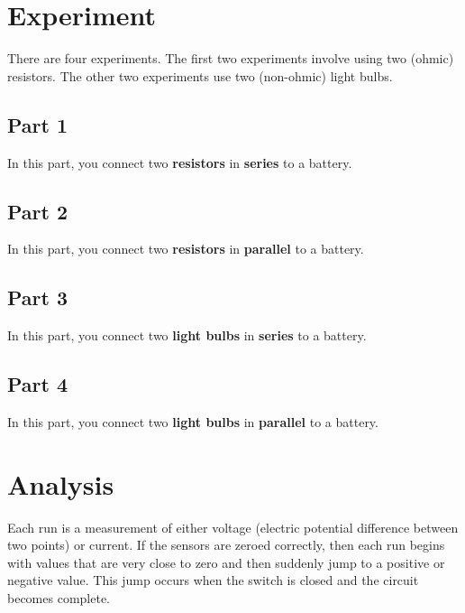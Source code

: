 \section{Experiment}
There are four experiments. The first two experiments involve using two (ohmic) resistors. The other two experiments use two (non-ohmic) light bulbs.
\subsection{Part 1}
In this part, you connect two \textbf{resistors} in \textbf{series} to a battery.
\subsection{Part 2}
In this part, you connect two \textbf{resistors} in \textbf{parallel} to a battery.
\subsection{Part 3}
In this part, you connect two \textbf{light bulbs} in \textbf{series} to a battery.
\subsection{Part 4}
In this part, you connect two \textbf{light bulbs} in \textbf{parallel} to a battery.
\section{Analysis}
Each run is a measurement of either voltage (electric potential difference between two points) or current. If the sensors are zeroed correctly, then each run begins with values that are very close to zero and then suddenly jump to a positive or negative value. This jump occurs when the switch is closed and the circuit becomes complete.

